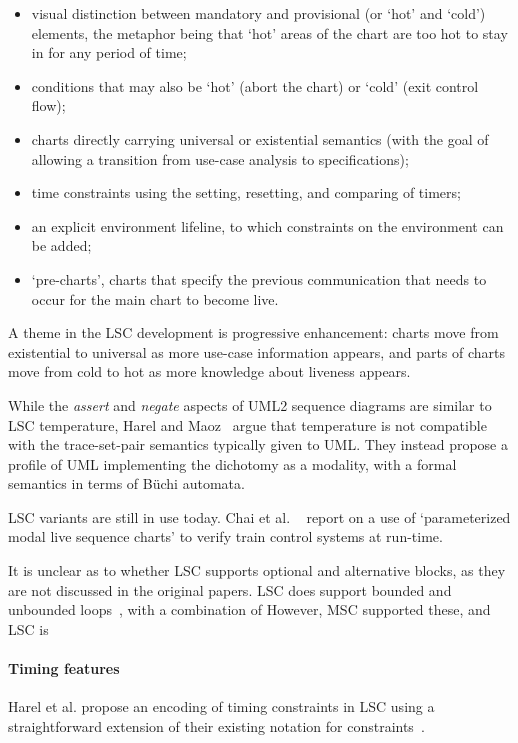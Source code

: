 \begin{itemize}
\item visual distinction between mandatory and provisional (or `hot'
  and `cold') elements, the metaphor being that `hot' areas of the
  chart are too hot to stay in for any period of time;
\item conditions that may also be `hot' (abort the
  chart) or `cold' (exit control flow);
\item charts directly carrying universal or existential semantics (with the
  goal of allowing a transition from use-case analysis to specifications);
\item time constraints using the setting, resetting, and comparing of timers;
\item an explicit environment lifeline, to which constraints on the
  environment can be added;
\item `pre-charts', charts that specify the previous communication
  that needs to occur for the main chart to become live.
\end{itemize}

A theme in the LSC development is progressive enhancement: charts move
from existential to universal as more use-case information appears,
and parts of charts move from cold to hot as more knowledge about
liveness appears.

While the \emph{assert} and \emph{negate} aspects of UML2 sequence diagrams
are similar to LSC temperature, Harel and Maoz~\cite{Harel08-ModalSD} argue
that temperature is not compatible with the trace-set-pair semantics typically
given to UML.  They instead propose a profile of UML implementing the
dichotomy as a modality, with a formal semantics in terms of B\"uchi automata.

LSC variants are still in use today. 
Chai et al. ~\cite{Chai21-PMLSC} report on a use of `parameterized modal
live sequence charts' to verify train control systems at run-time.

\begin{remark}
It is unclear as to whether LSC supports optional and
alternative blocks,
as they are not discussed in the original papers.
LSC does support bounded and unbounded loops~\cite{Harel03-MSC}, with a combination of
However, MSC supported these, and LSC is 
\end{remark}

\paragraph{Timing features}
Harel et al. propose an encoding of timing constraints in LSC using a
straightforward extension of their existing notation for
constraints~\cite{Harel03-MSC}.

